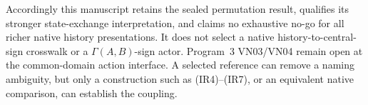 Accordingly this manuscript retains the sealed permutation result, qualifies its stronger state-exchange interpretation, and claims no exhaustive no-go for all richer native history presentations. It does not select a native history-to-central-sign crosswalk or a $\Gamma(A,B)$-sign actor. Program~3 VN03/VN04 remain open at the common-domain action interface. A selected reference can remove a naming ambiguity, but only a construction such as (IR4)--(IR7), or an equivalent native comparison, can establish the coupling.
\endgroup
\setcounter{section}{16}

